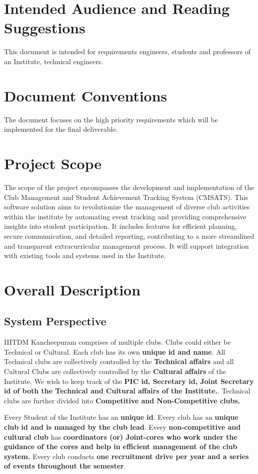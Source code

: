\section{Intended Audience and Reading Suggestions}
This document is intended for requirements engineers, students 
and professors of an Institute, technical engineers. 

\section{Document Conventions}
The document focuses on the high priority requirements which will be implemented for the final deliverable.

\section{Project Scope}
The scope of the project encompasses the development and implementation of the Club Management and Student Achievement Tracking System (CMSATS). This software solution aims to revolutionize the management of diverse club activities within the institute by automating event tracking and providing comprehensive insights into student participation. It includes features for efficient planning, secure communication, and detailed reporting, contributing to a more streamlined and transparent extracurricular management process. It will support integration with existing tools and systems used in the Institute.

\section{Overall Description}
\subsection{System Perspective}
IIITDM Kancheepuram comprises of multiple clubs. Clubs could either be Technical or Cultural. Each club has its own \textbf{unique id and name}.
All Technical clubs are collectively controlled by the \textbf{Technical affairs} and all Cultural Clubs are collectively controlled by the \textbf{Cultural affairs} of the Institute. We wish to keep track of the \textbf{PIC id, Secretary id, Joint Secretary id of both the Technical and Cultural affairs of the Institute.}. Technical clubs are further divided into \textbf{Competitive and Non-Competitive clubs.}
\vspace{1em}

\noindent Every Student of the Institute has an \textbf{unique id}. Every club has an \textbf{unique club id and is managed by the club lead}. Every \textbf{non-competitive and cultural club} has \textbf{coordinators (or) Joint-cores who work under the guidance of the cores and help in efficient management of the club system.} Every club conducts \textbf{one recruitment drive per year and a series of events throughout the semester}.
\vspace{1em}

